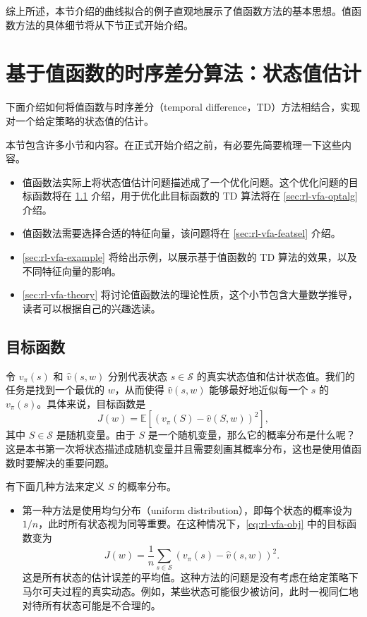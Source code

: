 综上所述，本节介绍的曲线拟合的例子直观地展示了值函数方法的基本思想。值函数方法的具体细节将从下节正式开始介绍。

\section{基于值函数的时序差分算法：状态值估计}
\label{sec:rl-vfa-td-state}

下面介绍如何将值函数与时序差分（temporal difference，TD）方法相结合，实现对一个给定策略的状态值的估计。

本节包含许多小节和内容。在正式开始介绍之前，有必要先简要梳理一下这些内容。

\begin{itemize}
  \item 值函数法实际上将状态值估计问题描述成了一个优化问题。这个优化问题的目标函数将在 \cref{sec:rl-vfa-objective} 介绍，用于优化此目标函数的 TD 算法将在 \cref{sec:rl-vfa-optalg} 介绍。
  \item 值函数法需要选择合适的特征向量，该问题将在 \cref{sec:rl-vfa-featsel} 介绍。
  \item \cref{sec:rl-vfa-example} 将给出示例，以展示基于值函数的 TD 算法的效果，以及不同特征向量的影响。
  \item \cref{sec:rl-vfa-theory} 将讨论值函数法的理论性质，这个小节包含大量数学推导，读者可以根据自己的兴趣选读。
\end{itemize}

\subsection{目标函数}
\label{sec:rl-vfa-objective}

令 $v_{\pi}(s)$ 和 $\hat{v}(s,w)$ 分别代表状态 $s\in \mathcal{S}$ 的真实状态值和估计状态值。我们的任务是找到一个最优的 $w$，从而使得 $\hat{v}(s,w)$ 能够最好地近似每一个 $s$ 的 $v_{\pi}(s)$。具体来说，目标函数是
\begin{equation}
J(w) = \mathbb{E}[(v_{\pi}(S) - \hat{v}(S, w))^{2}],
\label{eq:rl-vfa-obj}
\end{equation}
其中 $S \in \mathcal{S}$ 是随机变量。由于 $S$ 是一个随机变量，那么它的概率分布是什么呢？这是本书第一次将状态描述成随机变量并且需要刻画其概率分布，这也是使用值函数时要解决的重要问题。

有下面几种方法来定义 $S$ 的概率分布。

\begin{itemize}
  \item 第一种方法是使用均匀分布（uniform distribution），即每个状态的概率设为 $1/n$，此时所有状态视为同等重要。在这种情况下，\cref{eq:rl-vfa-obj} 中的目标函数变为
  \begin{equation}
  J(w) = \frac{1}{n} \sum_{s \in \mathcal{S}} (v_{\pi}(s) - \hat{v}(s, w))^{2}.
  \label{eq:rl-vfa-obj-uniform}
  \end{equation}
  这是所有状态的估计误差的平均值。这种方法的问题是没有考虑在给定策略下马尔可夫过程的真实动态。例如，某些状态可能很少被访问，此时一视同仁地对待所有状态可能是不合理的。
\end{itemize}

